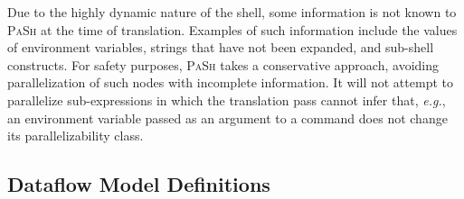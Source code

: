 \documentclass[sigplan, review, screen, anonymous]{acmart}
\newcommand{\eg}{{\em e.g.}, }
\newcommand{\kk}[1]{[{\color{magenta}kk: #1}]}
\newcommand{\sx}[1]{(\S\ref{#1})}
\newcommand{\sys}{{\scshape PaSh}\xspace}
\begin{document}
Due to the highly dynamic nature of the shell, some information is not known to \sys at the time of translation.
Examples of such information include the values of environment variables, strings that have not been expanded, and sub-shell constructs.
For safety purposes, \sys takes a conservative approach, avoiding parallelization of such nodes with incomplete information.
It will not attempt to parallelize sub-expressions in which the translation pass cannot infer that, \eg  an environment variable passed as an argument to a command does not change its parallelizability class.










\subsection{Dataflow Model Definitions}
\label{graph-components}
\end{document}
